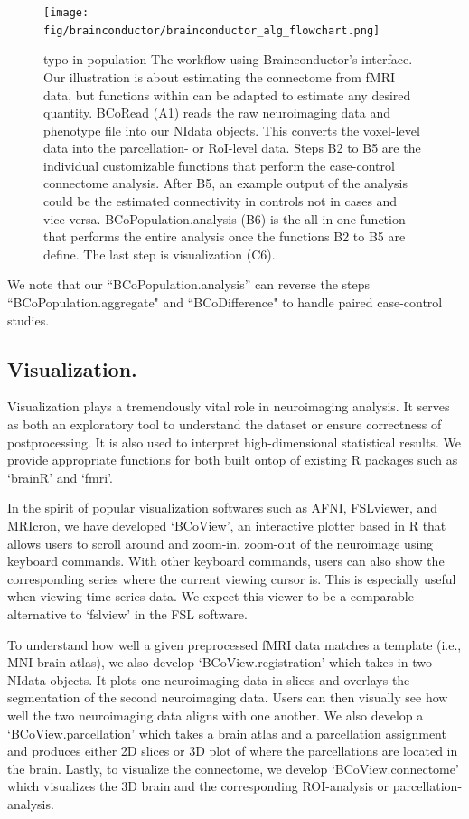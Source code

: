 \documentclass{nature}
\begin{document}
\begin{figure}[tb]
\centering
\texttt{[image: fig/brainconductor/brainconductor\_alg\_flowchart.png]}

\caption{ {\color{red}typo in population}
The workflow using Brainconductor's interface. Our illustration
is about estimating the connectome from fMRI data, but functions within can be
adapted to estimate any desired quantity. BCoRead (A1) reads the
raw neuroimaging
data and phenotype file into our NIdata objects. This
converts the voxel-level data into the parcellation- or RoI-level
data. Steps B2 to B5 are the individual
customizable functions that perform the case-control connectome analysis.
After B5, an example output of the analysis could be
the estimated connectivity in controls not in cases and vice-versa.
 BCoPopulation.analysis (B6) is the all-in-one function that performs the entire
analysis
once the functions B2 to B5 are define. The last step is visualization (C6).}
\label{fig:flowchart}
\end{figure}

We note that our ``BCoPopulation.analysis'' can reverse the steps
``BCoPopulation.aggregate" and ``BCoDifference" to handle paired case-control studies.


\subsection{Visualization.}
Visualization plays a tremendously vital role in neuroimaging analysis.
It serves as both an exploratory tool to understand the dataset or ensure
correctness of postprocessing. It is also used to interpret high-dimensional statistical
results.
We provide appropriate functions for both built ontop of existing R packages
such
as `brainR' and `fmri'.

In the spirit of popular visualization softwares such as AFNI, FSLviewer, and MRIcron, 
we have developed `BCoView', an interactive plotter based in R that allows users to
scroll around and
zoom-in, zoom-out of the neuroimage using keyboard commands. With other keyboard
commands, users can also show the corresponding series where the current
viewing
cursor is. This is especially useful when viewing time-series data. 
We expect this viewer to be a comparable alternative to `fslview' in
the FSL
software.

To understand how well a given preprocessed fMRI data matches a template (i.e.,
MNI brain
atlas), we also develop `BCoView.registration' which takes in two NIdata
objects.
It plots one neuroimaging data in slices and overlays the segmentation of the
second
neuroimaging data. Users can then visually see how well the two neuroimaging
data aligns
with one another. We also develop a `BCoView.parcellation' which takes a brain
atlas and
a parcellation assignment and produces either 2D slices or 3D plot of where the
parcellations
are located in the brain.
Lastly, to visualize the connectome, we develop `BCoView.connectome' which
visualizes the
3D brain and the corresponding ROI-analysis or parcellation-analysis.
\end{document}
